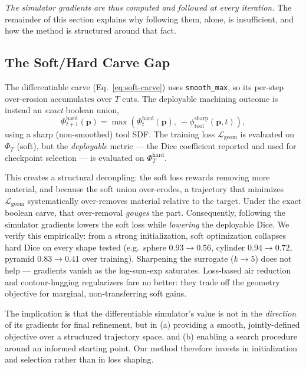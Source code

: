 \emph{The simulator gradients are thus computed and followed at every iteration.} The remainder of this section explains why following them, alone, is insufficient, and how the method is structured around that fact.

\subsection{The Soft/Hard Carve Gap}
\label{sec:gap}

The differentiable carve (Eq.~\ref{eq:soft-carve}) uses \texttt{smooth\_max}, so
its per-step over-erosion accumulates over $T$ cuts. The deployable machining
outcome is instead an \emph{exact} boolean union,
\begin{equation}
  \label{eq:hard-carve}
  \Phi_{t+1}^{\mathrm{hard}}(\mathbf{p}) = \max\!\left(\Phi_t^{\mathrm{hard}}(\mathbf{p}),\ -\phi_{\mathrm{tool}}^{\mathrm{sharp}}(\mathbf{p}, t)\right),
\end{equation}
using a sharp (non-smoothed) tool SDF. The training loss
$\mathcal{L}_{\mathrm{geom}}$ is evaluated on $\Phi_T$ (soft), but the
\emph{deployable} metric --- the Dice coefficient reported and used for
checkpoint selection --- is evaluated on $\Phi_T^{\mathrm{hard}}$.

This creates a structural decoupling: the soft loss rewards removing more
material, and because the soft union over-erodes, a trajectory that minimizes
$\mathcal{L}_{\mathrm{geom}}$ systematically over-removes material relative to
the target. Under the exact boolean carve, that over-removal \emph{gouges} the
part. Consequently, following the simulator gradients lowers the soft loss while
\emph{lowering} the deployable Dice. We verify this empirically: from a strong
initialization, soft optimization collapses hard Dice on every shape tested
(e.g.\ sphere $0.93 \!\to\! 0.56$, cylinder $0.94 \!\to\! 0.72$, pyramid
$0.83 \!\to\! 0.41$ over training). Sharpening the surrogate ($k \!\to\! 5$) does
not help --- gradients vanish as the log-sum-exp saturates. Loss-based air
reduction and contour-hugging regularizers fare no better: they trade off the
geometry objective for marginal, non-transferring soft gains.

The implication is that the differentiable simulator's value is not in the
\emph{direction} of its gradients for final refinement, but in (a) providing a
smooth, jointly-defined objective over a structured trajectory space, and (b)
enabling a search procedure around an informed starting point. Our method
therefore invests in initialization and selection rather than in loss shaping.

